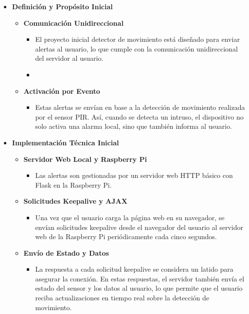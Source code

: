 \documentclass{report}
\begin{document}
\begin{itemize}
    \item \textbf{Definición y Propósito Inicial}
    \begin{itemize}
        \item \textbf{Comunicación Unidireccional}
        \begin{itemize}
            \item El proyecto inicial detector de movimiento está diseñado para enviar alertas al usuario, lo que cumple con la 
            comunicación unidireccional del servidor al usuario.
        \item
        \end{itemize}
        \item \textbf{Activación por Evento}
        \begin{itemize}
            \item Estas alertas se envían en base a la detección de movimiento realizada por el sensor PIR. Así, cuando se detecta un intruso, el dispositivo no 
            solo activa una alarma local, sino que también informa al usuario.
        \end{itemize}
    \end{itemize}

    \item \textbf{Implementación Técnica Inicial}
    \begin{itemize}
        \item \textbf{Servidor Web Local y Raspberry Pi}
        \begin{itemize}
            \item Las alertas son gestionadas por un servidor web HTTP básico con Flask en la Raspberry Pi. 
        \end{itemize}

        \item \textbf{Solicitudes Keepalive y AJAX}
            \begin{itemize}
                \item Una vez que el usuario carga la página web en su navegador, se envían solicitudes keepalive desde el navegador del usuario al servidor 
                web de la Raspberry Pi periódicamente cada cinco segundos.
            \end{itemize}

        \item \textbf{Envío de Estado y Datos}
        \begin{itemize}
            \item La respuesta a cada solicitud keepalive se considera un latido para asegurar la conexión. En estas respuestas, el servidor también envía 
            el estado del sensor y los datos al usuario, lo que permite que el usuario reciba actualizaciones en tiempo real sobre la detección de 
            movimiento.
        \end{itemize}


\end{itemize}
\end{itemize}
\end{document}
